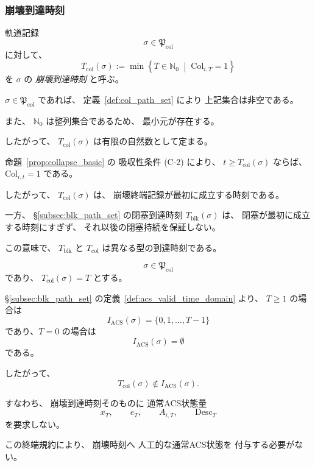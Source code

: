 \subsubsection{崩壊到達時刻}

\begin{definition}
\label{def:col_reaching_time}
軌道記録
\[
  \sigma\in\mathfrak{P}_{\mathrm{col}}
\]
に対して、
\[
  T_{\mathrm{col}}(\sigma)
  :=
  \min
  \left\{
    T\in\mathbb{N}_0
    \;\middle|\;
    \mathrm{Col}_{i,T}=1
  \right\}
\]
を
$\sigma$ の
\emph{崩壊到達時刻}
と呼ぶ。

$\sigma\in\mathfrak{P}_{\mathrm{col}}$
であれば、
定義~\ref{def:col_path_set} により
上記集合は非空である。

また、
$\mathbb{N}_0$
は整列集合であるため、
最小元が存在する。

したがって、
$T_{\mathrm{col}}(\sigma)$
は有限の自然数として定まる。
\end{definition}

\begin{remark}[崩壊到達時刻以降の指標]
\label{rem:col_reaching_time}
命題~\ref{prop:collapse_basic} の
吸収性条件 (C-2) により、
$t\ge T_{\mathrm{col}}(\sigma)$
ならば、
$\mathrm{Col}_{i,t}=1$
である。

したがって、
$T_{\mathrm{col}}(\sigma)$ は、
崩壊終端記録が最初に成立する時刻である。

一方、
\S\ref{subsec:blk_path_set}
の閉塞到達時刻
$T_{\mathrm{blk}}(\sigma)$
は、
閉塞が最初に成立する時刻にすぎず、
それ以後の閉塞持続を保証しない。

この意味で、
$T_{\mathrm{blk}}$
と
$T_{\mathrm{col}}$
は異なる型の到達時刻である。
\end{remark}

\begin{remark}[崩壊到達時刻とACS記録有効時刻域]
\label{rem:col_time_and_valid_domain}
\[
  \sigma\in\mathfrak{P}_{\mathrm{col}}
\]
であり、
$T_{\mathrm{col}}(\sigma)=T$
とする。

\S\ref{subsec:blk_path_set}
の定義~\ref{def:acs_valid_time_domain} より、
$T\ge1$ の場合は
\[
  I_{\mathrm{ACS}}(\sigma)
  =
  \{0,1,\ldots,T-1\}
\]
であり、$T=0$ の場合は
\[
  I_{\mathrm{ACS}}(\sigma)=\emptyset
\]
である。

したがって、
\[
  T_{\mathrm{col}}(\sigma)
  \notin
  I_{\mathrm{ACS}}(\sigma).
\]

すなわち、
崩壊到達時刻そのものに
通常ACS状態量
\[
  x_T,\qquad
  e_T,\qquad
  A_{i,T},\qquad
  \mathrm{Desc}_T
\]
を要求しない。

この終端規約により、
崩壊時刻へ
人工的な通常ACS状態を
付与する必要がない。
\end{remark}

